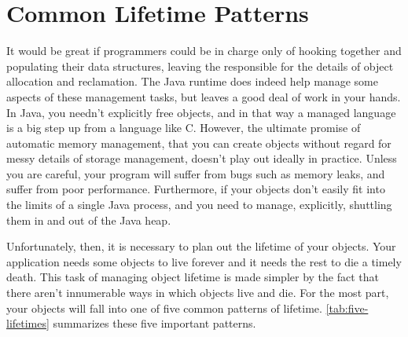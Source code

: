 \chapter{Common Lifetime Patterns}
It would be great if programmers could be in charge only of hooking together and
populating their data structures, leaving the \jre responsible for the details of
object allocation and reclamation. The Java runtime does indeed help manage some
aspects of these management tasks, but leaves a good deal of work in your hands.
In Java, you needn't explicitly free objects, and in that way a managed language
is a big step up from a language like C. However, the ultimate promise of
automatic memory management, that you can create objects without regard for messy
details of storage management, doesn't play out ideally in practice. Unless you
are careful, your program will suffer from bugs such as memory leaks, and suffer
from poor performance. Furthermore, if your objects don't easily fit into the
limits of a single Java process, and you need to manage, explicitly, shuttling
them in and out of the Java heap.

Unfortunately, then, it is necessary to plan out the lifetime of your objects.
Your application needs some objects to live forever and it needs the rest to die
a timely death. This task of managing object lifetime is made simpler by the
fact that there aren't innumerable ways in which objects live and die. For the most part, your objects
will fall into one of five common patterns of lifetime.
\autoref{tab:five-lifetimes} summarizes these five important patterns.


